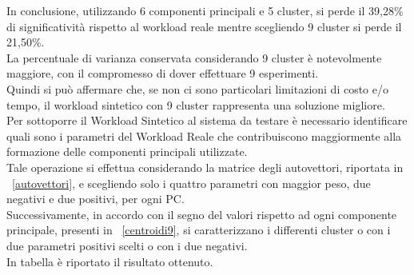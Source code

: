 In conclusione, utilizzando 6 componenti principali e 5 cluster, si perde il 39,28\%
di significatività rispetto al workload reale mentre scegliendo 9 cluster si perde il 21,50\%.\\
La percentuale di varianza conservata considerando 9 cluster è notevolmente maggiore,
con il compromesso di dover effettuare 9 esperimenti.\\
Quindi si può affermare che, se non ci sono particolari limitazioni di costo e/o tempo,
il workload sintetico con 9 cluster rappresenta una soluzione migliore.\\
Per sottoporre il Workload Sintetico al sistema da testare è necessario identificare
quali sono i parametri del Workload Reale che contribuiscono maggiormente
alla formazione delle componenti principali utilizzate.\\
Tale operazione si effettua considerando la matrice degli autovettori, riportata
in \figurename~\ref{autovettori}, e scegliendo solo i quattro parametri con maggior
peso, due negativi e due positivi, per ogni PC.\\
Successivamente, in accordo con il segno del valori rispetto ad ogni componente
principale, presenti in \figurename~\ref{centroidi9}, si caratterizzano i
differenti cluster o con i due parametri positivi scelti o con i due negativi.\\
In tabella è riportato il risultato ottenuto.
